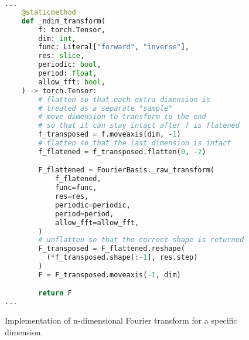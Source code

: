 \begin{figure}[H]
  \centering
  \begin{lstlisting}[language=Python]
...
    @staticmethod
    def _ndim_transform(
        f: torch.Tensor,
        dim: int,
        func: Literal["forward", "inverse"],
        res: slice,
        periodic: bool,
        period: float,
        allow_fft: bool,
    ) -> torch.Tensor:
        # flatten so that each extra dimension is
        # treated as a separate "sample"
        # move dimension to transform to the end
        # so that it can stay intact after f is flatened
        f_transposed = f.moveaxis(dim, -1)
        # flatten so that the last dimension is intact
        f_flatened = f_transposed.flatten(0, -2)

        F_flattened = FourierBasis._raw_transform(
            f_flatened,
            func=func,
            res=res,
            periodic=periodic,
            period=period,
            allow_fft=allow_fft,
        )
        # unflatten so that the correct shape is returned
        F_transposed = F_flattened.reshape(
          (*f_transposed.shape[:-1], res.step)
        )
        F = F_transposed.moveaxis(-1, dim)

        return F
...
  \end{lstlisting}
  \caption{Implementation of n-dimensional Fourier transform for a specific dimension.}\label{fig:ndim_fourier_transform_impl}
\end{figure}


